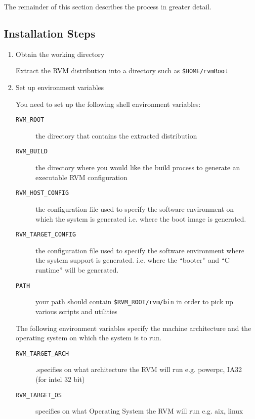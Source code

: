 The remainder of this section describes the process in greater detail.

\subsection{Installation Steps}

\begin{enumerate}
\item Obtain the working directory

Extract the RVM distribution into
a directory such as {\tt \$HOME/rvmRoot}

\item Set up environment variables

You need to set up the following shell environment variables:

\begin{description}
\item [{\tt RVM\_ROOT}] the directory that contains the extracted
distribution 
\item [{\tt RVM\_BUILD}] the directory where you would like the build
process to generate an executable RVM configuration

\item [{\tt RVM\_HOST\_CONFIG}] the configuration file used to specify
the software environment on which the system is generated i.e. where the
boot image is generated.

\item [{\tt RVM\_TARGET\_CONFIG}] the configuration file used to specify
the software environment where the system support is generated. i.e. where
the ``booter'' and ``C runtime'' will be generated.

\item[{\tt PATH}] your path should contain {\tt \$RVM\_ROOT/rvm/bin} in
order to pick up various scripts and utilities
\end{description}

The following environment variables specify the machine architecture and
the operating system on which the system is to run.
\begin{description}

\item [{\tt RVM\_TARGET\_ARCH}].specifies on what architecture
the RVM will run e.g.  powerpc, IA32 (for intel 32 bit)

\item [{\tt RVM\_TARGET\_OS}] specifies on what Operating System
the RVM will run e.g. aix, linux


\end{description}
\end{enumerate}
